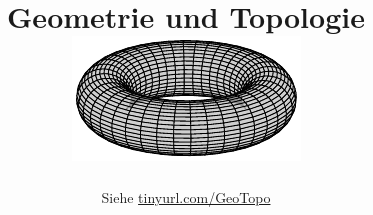 \begin{titlepage}
    \author{Siehe \href{http://tinyurl.com/GeoTopo}{tinyurl.com/GeoTopo}}
    \title{Geometrie und Topologie\\\vspace{10cm}
        \includegraphics[width=0.9\linewidth]{figures/Torus.pdf}}
    \maketitle
\end{titlepage}
